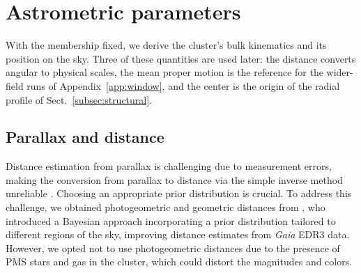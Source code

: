 \documentclass{aa}
\begin{document}
\section{Astrometric parameters}\label{sec:astrometry}
With the membership fixed, we derive the cluster's bulk kinematics and its position on the sky. Three of these quantities are used later: the distance converts angular to physical scales, the mean proper motion is the reference for the wider-field runs of Appendix~\ref{app:window}, and the center is the origin of the radial profile of Sect.~\ref{subsec:structural}.

\subsection{Parallax and distance}\label{subsubsec:parallax}
Distance estimation from parallax is challenging due to measurement errors, making the conversion from parallax to distance via the simple inverse method unreliable \citep{2015PASP..127..994B,2021AJ....161..147B}. Choosing an appropriate prior distribution is crucial. To address this challenge, we obtained photogeometric and geometric distances from \citet{2021AJ....161..147B}, who introduced a Bayesian approach incorporating a prior distribution tailored to different regions of the sky, improving distance estimates from \textit{Gaia} EDR3 data. However, we opted not to use photogeometric distances due to the presence of PMS stars and gas in the cluster, which could distort the magnitudes and colors.
\end{document}
